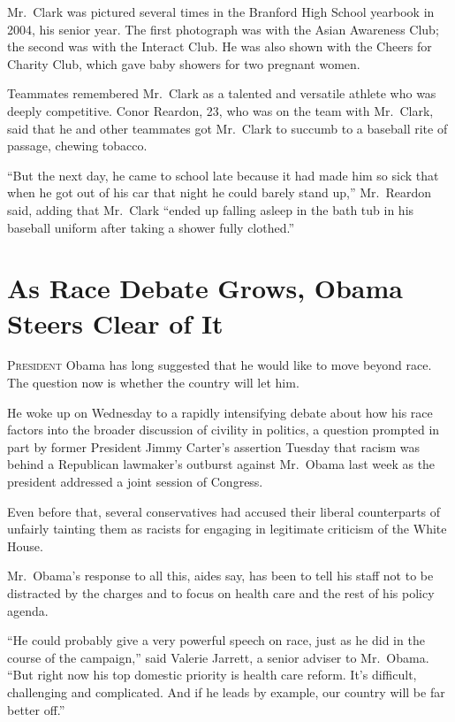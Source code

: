 ﻿\documentclass[12pt]{article}
\begin{document}
Mr.~Clark was pictured several times in the Branford High School yearbook in 2004, his senior year.
The first photograph was with the Asian Awareness Club; the second was with the Interact Club. He
was also shown with the Cheers for Charity Club, which gave baby showers for two pregnant women.

Teammates remembered Mr.~Clark as a talented and versatile athlete who was deeply competitive. Conor
Reardon, 23, who was on the team with Mr.~Clark, said that he and other teammates got Mr.~Clark to
succumb to a baseball rite of passage, chewing tobacco.

``But the next day, he came to school late because it had made him so sick that when he got out of
his car that night he could barely stand up,'' Mr.~Reardon said, adding that Mr.~Clark ``ended up
falling asleep in the bath tub in his baseball uniform after taking a shower fully clothed.''

\section{As Race Debate Grows, Obama Steers Clear of It}

\lettrine{P}{resident} Obama has long suggested that he would like to move beyond race. The question
now is whether the country will let him.

He woke up on Wednesday to a rapidly intensifying debate about how his race factors into the broader
discussion of civility in politics, a question prompted in part by former President Jimmy Carter's
assertion Tuesday that racism was behind a Republican lawmaker's outburst against Mr.~Obama last
week as the president addressed a joint session of Congress.

Even before that, several conservatives had accused their liberal counterparts of unfairly tainting
them as racists for engaging in legitimate criticism of the White House.

Mr.~Obama's response to all this, aides say, has been to tell his staff not to be distracted by the
charges and to focus on health care and the rest of his policy agenda.

``He could probably give a very powerful speech on race, just as he did in the course of the
campaign,'' said Valerie Jarrett, a senior adviser to Mr.~Obama. ``But right now his top domestic
priority is health care reform. It's difficult, challenging and complicated. And if he leads by
example, our country will be far better off.''
\end{document}
